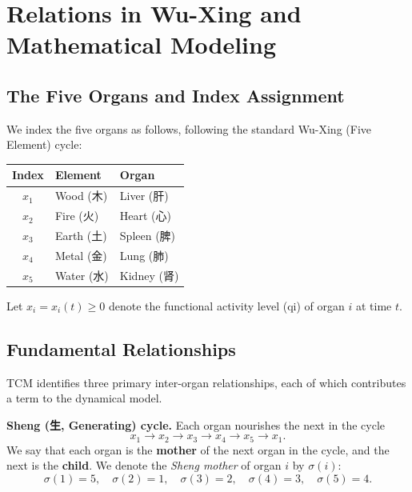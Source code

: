 \documentclass{article}
\begin{document}
\section{Relations in Wu-Xing and Mathematical Modeling}

\subsection{The Five Organs and Index Assignment}

\noindent
We index the five organs as follows, following the standard Wu-Xing (Five Element)
cycle:

\begin{center}
\begin{tabular}{cll}
\toprule
Index & Element & Organ \\
\midrule
$x_1$ & Wood\; (木) & Liver\; (肝) \\
$x_2$ & Fire\; (火)  & Heart\; (心) \\
$x_3$ & Earth\; (土) & Spleen\; (脾) \\
$x_4$ & Metal\; (金) & Lung\; (肺) \\
$x_5$ & Water\; (水) & Kidney\; (肾) \\
\bottomrule
\end{tabular}
\end{center}

\noindent
Let $x_i = x_i(t) \geq 0$ denote the functional activity level (qi) of organ $i$
at time $t$.

\subsection{Fundamental Relationships}

\noindent
TCM identifies three primary inter-organ relationships, each of which contributes
a term to the dynamical model.

\medskip
\noindent\textbf{Sheng (生, Generating) cycle.}
Each organ nourishes the next in the cycle
\[
x_1 \to x_2 \to x_3 \to x_4 \to x_5 \to x_1.
\]
We say that   each organ is the {\bf mother} of the next organ in the cycle, and the next is the {\bf child}.  
We denote the \emph{Sheng mother} of organ $i$ by $\sigma(i)$:
\[
\sigma(1)=5,\quad \sigma(2)=1,\quad \sigma(3)=2,\quad \sigma(4)=3,\quad \sigma(5)=4.
\]
 


\medskip
\end{document}
